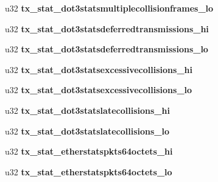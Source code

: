 \begin{DoxyCompactItemize}
\item 
\hypertarget{structbnx2x__eth__stats_a0a40da71444919ac57bbcc6ab4eb8785}{
u32 {\bfseries tx\_\-stat\_\-dot3statsmultiplecollisionframes\_\-lo}}
\label{structbnx2x__eth__stats_a0a40da71444919ac57bbcc6ab4eb8785}

\item 
\hypertarget{structbnx2x__eth__stats_a210c08c61a6d012706e783c57882fb08}{
u32 {\bfseries tx\_\-stat\_\-dot3statsdeferredtransmissions\_\-hi}}
\label{structbnx2x__eth__stats_a210c08c61a6d012706e783c57882fb08}

\item 
\hypertarget{structbnx2x__eth__stats_aa36551aabb4138c3e0a7b81054837612}{
u32 {\bfseries tx\_\-stat\_\-dot3statsdeferredtransmissions\_\-lo}}
\label{structbnx2x__eth__stats_aa36551aabb4138c3e0a7b81054837612}

\item 
\hypertarget{structbnx2x__eth__stats_a594e42304fd289e5e468581639e803ae}{
u32 {\bfseries tx\_\-stat\_\-dot3statsexcessivecollisions\_\-hi}}
\label{structbnx2x__eth__stats_a594e42304fd289e5e468581639e803ae}

\item 
\hypertarget{structbnx2x__eth__stats_a09a4969df0d7c7e07e62365b4d270eb4}{
u32 {\bfseries tx\_\-stat\_\-dot3statsexcessivecollisions\_\-lo}}
\label{structbnx2x__eth__stats_a09a4969df0d7c7e07e62365b4d270eb4}

\item 
\hypertarget{structbnx2x__eth__stats_aa744ed7c413d67daf0240f6db1665ea4}{
u32 {\bfseries tx\_\-stat\_\-dot3statslatecollisions\_\-hi}}
\label{structbnx2x__eth__stats_aa744ed7c413d67daf0240f6db1665ea4}

\item 
\hypertarget{structbnx2x__eth__stats_a8dc3527813455266ffa1c982f1aaaab5}{
u32 {\bfseries tx\_\-stat\_\-dot3statslatecollisions\_\-lo}}
\label{structbnx2x__eth__stats_a8dc3527813455266ffa1c982f1aaaab5}

\item 
\hypertarget{structbnx2x__eth__stats_a9658cf284a41c17e25504e20b281c35b}{
u32 {\bfseries tx\_\-stat\_\-etherstatspkts64octets\_\-hi}}
\label{structbnx2x__eth__stats_a9658cf284a41c17e25504e20b281c35b}

\item 
\hypertarget{structbnx2x__eth__stats_a476d12ee39838212e10ed703aa671c46}{
u32 {\bfseries tx\_\-stat\_\-etherstatspkts64octets\_\-lo}}
\label{structbnx2x__eth__stats_a476d12ee39838212e10ed703aa671c46}


\end{DoxyCompactItemize}
